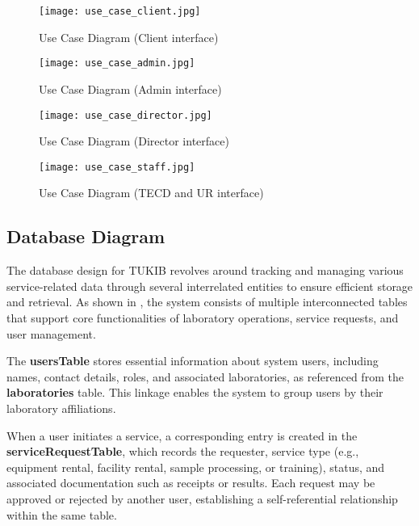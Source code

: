 \begin{figure}[h]
	\centering
	\begin{minipage}{0.30\textwidth}
		\centering
		\texttt{[image: use\_case\_client.jpg]}
		\caption{Use Case Diagram (Client interface)}
		\label{fig:use_case_client}
	\end{minipage}%
	\hfill
	\begin{minipage}{0.32\textwidth}
		\centering
		\texttt{[image: use\_case\_admin.jpg]}
		\caption{Use Case Diagram (Admin interface)}
		\label{fig:use_case_admin}
	\end{minipage}
	
	\vspace{0.5cm} %
	
	\begin{minipage}{0.30\textwidth}
		\centering
		\texttt{[image: use\_case\_director.jpg]}
		\caption{Use Case Diagram (Director interface)}
		\label{fig:use_case_director}
	\end{minipage}%
	\hfill
	\begin{minipage}{0.30\textwidth}
		\centering
		\texttt{[image: use\_case\_staff.jpg]}
		\caption{Use Case Diagram (TECD and UR interface)}
		\label{fig:use_case_staff}
	\end{minipage}
\end{figure}

\newpage

\subsection{Database Diagram}

The database design for TUKIB revolves around tracking and managing various service-related data through several interrelated entities to ensure efficient storage and retrieval. As shown in , the system consists of multiple interconnected tables that support core functionalities of laboratory operations, service requests, and user management.

The \textbf{usersTable} stores essential information about system users, including names, contact details, roles, and associated laboratories, as referenced from the \textbf{laboratories} table. This linkage enables the system to group users by their laboratory affiliations.

When a user initiates a service, a corresponding entry is created in the \textbf{serviceRequestTable}, which records the requester, service type (e.g., equipment rental, facility rental, sample processing, or training), status, and associated documentation such as receipts or results. Each request may be approved or rejected by another user, establishing a self-referential relationship within the same table.

